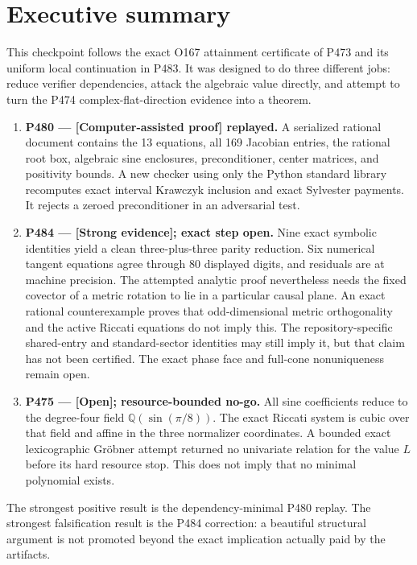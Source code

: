 \documentclass[11pt,a4paper,openany]{report}
\newcommand{\Q}{\mathbb Q}
\newcommand{\statusCAP}{\textcolor{fingreen}{[Computer-assisted proof]}}
\newcommand{\statusStrong}{\textcolor{finblue}{[Strong evidence]}}
\newcommand{\statusOpen}{\textcolor{finorange}{[Open]}}
\begin{document}
\chapter{Executive summary}

This checkpoint follows the exact O167 attainment certificate of P473 and its
uniform local continuation in P483. It was designed to do three different
jobs: reduce verifier dependencies, attack the algebraic value directly, and
attempt to turn the P474 complex-flat-direction evidence into a theorem.

\begin{enumerate}
\item \textbf{P480 --- \statusCAP{} replayed.} A serialized rational document
contains the 13 equations, all 169 Jacobian entries, the rational root box,
algebraic sine enclosures, preconditioner, center matrices, and positivity
bounds. A new checker using only the Python standard library recomputes exact
interval Krawczyk inclusion and exact Sylvester payments. It rejects a zeroed
preconditioner in an adversarial test.

\item \textbf{P484 --- \statusStrong{}; exact step open.} Nine exact symbolic
identities yield a clean three-plus-three parity reduction. Six numerical
tangent equations agree through 80 displayed digits, and residuals are at
machine precision. The attempted analytic proof nevertheless needs the fixed
covector of a metric rotation to lie in a particular causal plane. An exact
rational counterexample proves that odd-dimensional metric orthogonality and
the active Riccati equations do not imply this. The repository-specific
shared-entry and standard-sector identities may still imply it, but that
claim has not been certified. The exact phase face and full-cone
nonuniqueness remain open.

\item \textbf{P475 --- \statusOpen{}; resource-bounded no-go.} All sine
coefficients reduce to the degree-four field \(\Q(\sin(\pi/8))\). The exact
Riccati system is cubic over that field and affine in the three normalizer
coordinates. A bounded exact lexicographic Gr\"obner attempt returned no
univariate relation for the value \(L\) before its hard resource stop. This
does not imply that no minimal polynomial exists.
\end{enumerate}

The strongest positive result is the dependency-minimal P480 replay. The
strongest falsification result is the P484 correction: a beautiful structural
argument is not promoted beyond the exact implication actually paid by the
artifacts.
\end{document}
